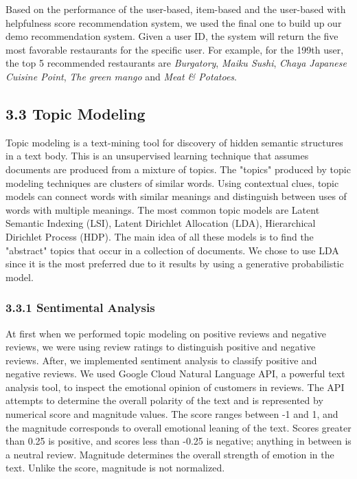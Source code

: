 \documentclass{neu_handout}
\begin{document}
Based on the performance of the user-based, item-based and the user-based with helpfulness score recommendation system, we used the final one to build up our demo recommendation system. Given a user ID, the system will return the five most favorable restaurants for the specific user. For example, for the 199th user, the top 5 recommended restaurants are \emph{Burgatory}, \emph{Maiku Sushi}, \emph{Chaya Japanese Cuisine Point}, \emph{The green mango} and \emph{Meat \& Potatoes}. 
 
\subsection*{3.3 Topic Modeling}

Topic modeling is a text-mining tool for discovery of hidden semantic structures in a text body. This is an unsupervised learning technique that assumes documents are produced from a mixture of topics. The "topics" produced by topic modeling techniques are clusters of similar words. Using contextual clues, topic models can connect words with similar meanings and distinguish between uses of words with multiple meanings. 
The most common topic models are Latent Semantic Indexing (LSI), Latent Dirichlet Allocation (LDA), Hierarchical Dirichlet Process (HDP). The main idea of all these models is to find the "abstract" topics that occur in a collection of documents. We chose to use LDA since it is the most preferred due to it results by using a generative probabilistic model.

\subsubsection*{3.3.1 Sentimental Analysis}
At first when we performed topic modeling on positive reviews and negative reviews, we were using review ratings to distinguish positive and negative reviews. After, we implemented sentiment analysis to classify positive and negative reviews. We used Google Cloud Natural Language API, a powerful text analysis tool, to inspect the emotional opinion of customers in reviews. The API attempts to determine the overall polarity of the text and is represented by numerical score and magnitude values. The score ranges between -1 and 1, and the magnitude corresponds to overall emotional leaning of the text. Scores greater than 0.25 is positive, and scores less than -0.25 is negative; anything in between is  a neutral review. Magnitude determines the overall strength of emotion in the text. Unlike the score, magnitude is not normalized.\\
\end{document}
